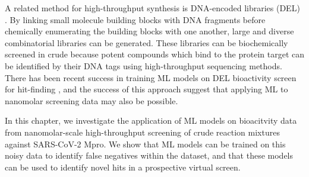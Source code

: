 A related method for high-throughput synthesis is DNA-encoded libraries (DEL) \cite{GirondaMartinez2021DNALibrary}. By linking small molecule building blocks with DNA fragments before chemically enumerating the building blocks with one another, large and diverse combinatorial libraries can be generated. These libraries can be biochemically screened in crude because potent compounds which bind to the protein target can be identified by their DNA tags using high-throughput sequencing methods. There has been recent success in training ML models on DEL bioactivity screen for hit-finding \cite{McCloskey2020DNALibrary, Lim2022DELCountML}, and the success of this approach suggest that applying ML to nanomolar screening data may also be possible.

In this chapter, we investigate the application of ML models on bioacitvity data from nanomolar-scale high-throughput screening of crude reaction mixtures against SARS-CoV-2 Mpro. We show that ML models can be trained on this noisy data to identify false negatives within the dataset, and that these models can be used to identify novel hits in a prospective virtual screen.



